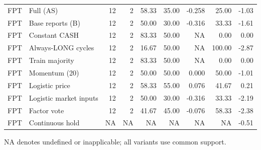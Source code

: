 \begin{table}[htbp]
\begin{tabular}{llrrrrrrr}
FPT & Full (AS) & 12 & 2 & 58.33 & 35.00 & -0.258 & 25.00 & -1.03 \\
FPT & Base reports (B) & 12 & 2 & 50.00 & 30.00 & -0.316 & 33.33 & -1.61 \\
FPT & Constant CASH & 12 & 2 & 83.33 & 50.00 & NA & 0.00 & 0.00 \\
FPT & Always-LONG cycles & 12 & 2 & 16.67 & 50.00 & NA & 100.00 & -2.87 \\
FPT & Train majority & 12 & 2 & 83.33 & 50.00 & NA & 0.00 & 0.00 \\
FPT & Momentum (20) & 12 & 2 & 50.00 & 50.00 & 0.000 & 50.00 & -1.01 \\
FPT & Logistic price & 12 & 2 & 58.33 & 55.00 & 0.076 & 41.67 & 0.21 \\
FPT & Logistic market inputs & 12 & 2 & 50.00 & 30.00 & -0.316 & 33.33 & -2.19 \\
FPT & Factor vote & 12 & 2 & 41.67 & 45.00 & -0.076 & 58.33 & -2.38 \\
FPT & Continuous hold & NA & NA & NA & NA & NA & NA & -0.51 \\
\hline
\end{tabular}
\par\smallskip\footnotesize NA denotes undefined or inapplicable; all variants use common support.
\end{table}

